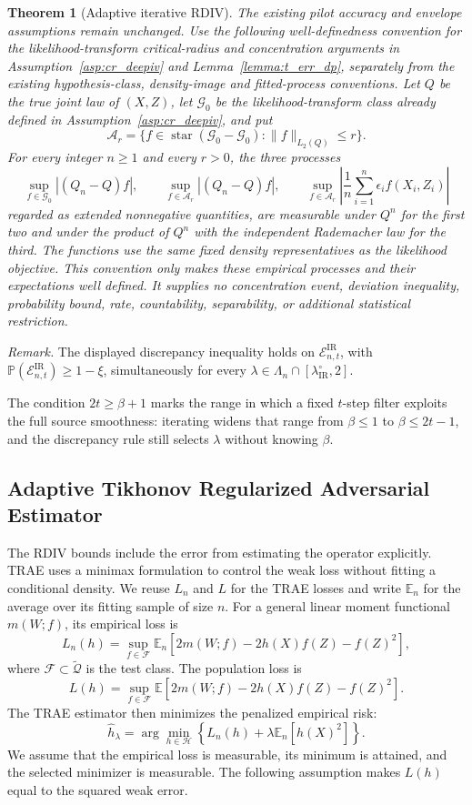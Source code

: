 \documentclass[12pt]{article}
\theoremstyle{plain}
\newtheorem{theorem}{Theorem}[section]
\theoremstyle{definition}
\theoremstyle{remark}
\begin{document}
\begin{theorem}[Adaptive iterative RDIV]
The existing pilot accuracy and envelope assumptions remain unchanged. Use the following well-definedness convention for the likelihood-transform critical-radius and concentration arguments in Assumption~\ref{asp:cr_deepiv} and Lemma~\ref{lemma:t_err_dp}, separately from the existing hypothesis-class, density-image and fitted-process conventions. Let $Q$ be the true joint law of $(X,Z)$, let $\mathcal G_0$ be the likelihood-transform class already defined in Assumption~\ref{asp:cr_deepiv}, and put \[ \mathcal A_r=\{f\in\operatorname{star}(\mathcal G_0-\mathcal G_0):\|f\|_{L_2(Q)}\leqslant r\}. \] For every integer $n\geqslant1$ and every $r>0$, the three processes \[ \sup_{f\in\mathcal G_0}|(Q_n-Q)f|,\qquad \sup_{f\in\mathcal A_r}|(Q_n-Q)f|,\qquad \sup_{f\in\mathcal A_r}\left|\frac1n\sum_{i=1}^n\epsilon_i f(X_i,Z_i)\right| \] regarded as extended nonnegative quantities, are measurable under $Q^n$ for the first two and under the product of $Q^n$ with the independent Rademacher law for the third. The functions use the same fixed density representatives as the likelihood objective. This convention only makes these empirical processes and their expectations well defined. It supplies no concentration event, deviation inequality, probability bound, rate, countability, separability, or additional statistical restriction.
\end{theorem}

\noindent\textit{Remark.} The displayed discrepancy inequality holds on $\mathcal E_{n,t}^{\mathrm{IR}}$, with $\mathbb P(\mathcal E_{n,t}^{\mathrm{IR}})\geqslant1-\xi$, simultaneously for every $\lambda\in\Lambda_n\cap[\lambda_{\mathrm{IR}}^\circ,2]$.


The condition $2t\geqslant\beta+1$ marks the range in which a fixed $t$-step filter exploits the full source smoothness: iterating widens that range from $\beta\leqslant1$ to $\beta\leqslant2t-1$, and the discrepancy rule still selects $\lambda$ without knowing $\beta$.
 
\subsection{Adaptive Tikhonov Regularized Adversarial Estimator} \label{sec:trae}


The RDIV bounds include the error from estimating the operator explicitly. TRAE uses a minimax formulation to control the weak loss without fitting a conditional density. We reuse $L_n$ and $L$ for the TRAE losses and write $\mathbb E_n$ for the average over its fitting sample of size $n$. For a general linear moment functional $m(W;f)$, its empirical loss is
\[
L_n(h) =\sup_{f\in\mathcal F}\mathbb{E}_{n}\left[ 2m( W;f) -2h( X) f( Z) -f( Z)^{2}\right],
\]
where $\mathcal F\subset\tilde{\mathcal Q}$ is the test class. The population loss is
\[
L(h) =\sup_{f\in\mathcal F}\mathbb{E}\left[ 2m( W;f) -2h( X) f( Z) -f( Z)^{2}\right].
\]
The TRAE estimator then minimizes the penalized empirical risk:
\[
\hat{h}_{\lambda } =\arg\min_{h\in \mathcal{H}}\left\{L_n(h)+\lambda\mathbb E_n[h(X)^2]\right\}.
\] 
We assume that the empirical loss is measurable, its minimum is attained, and the selected minimizer is measurable.
The following assumption makes $L(h)$ equal to the squared weak error.
\end{document}
